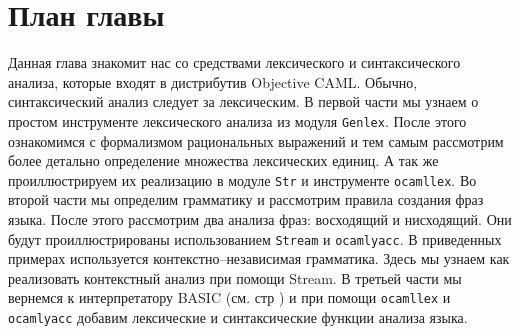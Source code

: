 \section{План главы}

Данная глава знакомит нас со средствами лексического и синтаксического анализа,
которые входят в дистрибутив Objective CAML. Обычно, синтаксический анализ
следует за лексическим. В первой части мы узнаем о простом инструменте
лексического анализа из модуля \texttt{Genlex}. После этого ознакомимся с
формализмом рациональных выражений и тем самым рассмотрим более детально
определение множества лексических единиц. А так же проиллюстрируем их реализацию
в модуле \texttt{Str} и инструменте \texttt{ocamllex}. Во второй части мы
определим грамматику и рассмотрим правила создания фраз языка. После этого
рассмотрим два анализа фраз: восходящий и нисходящий. Они будут
проиллюстрированы использованием \texttt{Stream} и \texttt{ocamlyacc}. В
приведенных примерах используется контекстно–независимая грамматика. Здесь мы
узнаем как реализовать контекстный анализ при помощи Stream. В третьей части мы
вернемся к интерпретатору BASIC (см. стр \cite{??}) и при помощи
\texttt{ocamllex} и \texttt{ocamlyacc} добавим лексические и синтаксические
функции анализа языка.
